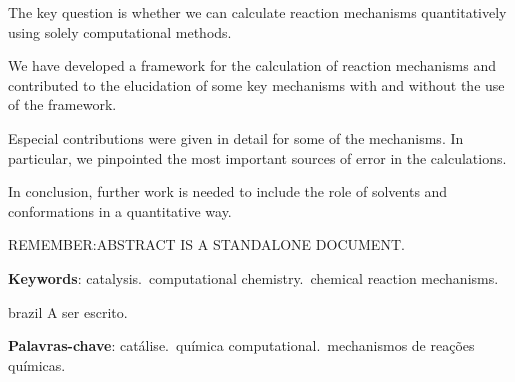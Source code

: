 \setlength{\absparsep}{18pt} %

\begin{resumo}[Abstract]
The key question is whether we can calculate reaction mechanisms quantitatively
using solely computational methods.

We have developed a framework for the calculation of reaction mechanisms and
contributed to the elucidation of some key mechanisms with and without the use
of the framework.

Especial contributions were given in detail for some of the mechanisms.
In particular, we pinpointed the most important sources of error in the
calculations.

In conclusion, further work is needed to include the role of solvents and
conformations in a quantitative way.

REMEMBER:\@ ABSTRACT IS A STANDALONE DOCUMENT.\@

\vspace{\onelineskip}

\noindent
\textbf{Keywords}: catalysis.\ computational chemistry.\ chemical reaction mechanisms.
\end{resumo}

\begin{resumo}[Resumo]
\begin{otherlanguage*}{brazil}
A ser escrito.

\vspace{\onelineskip}

\noindent
\textbf{Palavras-chave}: catálise.\ química computational.\ mechanismos de
reações químicas.
\end{otherlanguage*}
\end{resumo}
